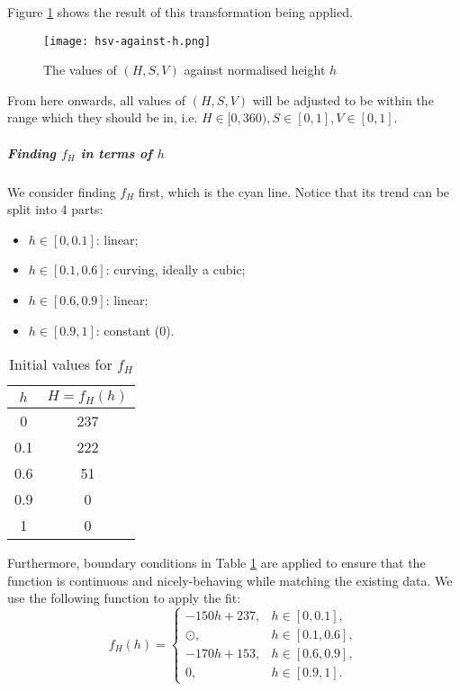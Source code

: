 Figure \ref{fig:hsv-against-h} shows the result of this transformation being applied.

\begin{figure}[!ht]
    \centering
    \texttt{[image: hsv-against-h.png]}
    \caption{The values of \((H, S, V)\) against normalised height \(h\)}
    \label{fig:hsv-against-h}
\end{figure}

From here onwards, all values of \((H, S, V)\) will be adjusted to be within the range which they should be in, i.e. \(H \in [0, 360), S \in [0, 1], V \in [0, 1]\).

\subparagraph{Finding \(f_H\) in terms of \(h\)}

We consider finding \(f_H\) first, which is the cyan line. Notice that its trend can be split into 4 parts:
\begin{itemize}
    \item \(h \in [0, 0.1]\): linear;
    \item \(h \in [0.1, 0.6]\): curving, ideally a cubic;
    \item \(h \in [0.6, 0.9]\): linear;
    \item \(h \in [0.9, 1]\): constant (0).
\end{itemize}

\begin{table}[!ht]
    \centering

    \begin{tabular}{|c|c|}
        \hline
        \(h\) & \(H = f_H(h)\) \\
        \hline
        0     & 237            \\
        0.1   & 222            \\
        0.6   & 51             \\
        0.9   & 0              \\
        1     & 0              \\
        \hline
    \end{tabular}
    \caption{Initial values for \(f_H\)}
    \label{tab:h-against-h-iv}
\end{table}

Furthermore, boundary conditions in Table \ref{tab:h-against-h-iv} are applied to ensure that the function is continuous and nicely-behaving while matching the existing data. We use the following function to apply the fit:
\[
    f_H(h) = \begin{cases}
        -150h + 237, & h \in [0, 0.1],   \\
        \odot,       & h \in [0.1, 0.6], \\
        -170h + 153, & h \in [0.6, 0.9], \\
        0,           & h \in [0.9, 1].
    \end{cases}
\]

